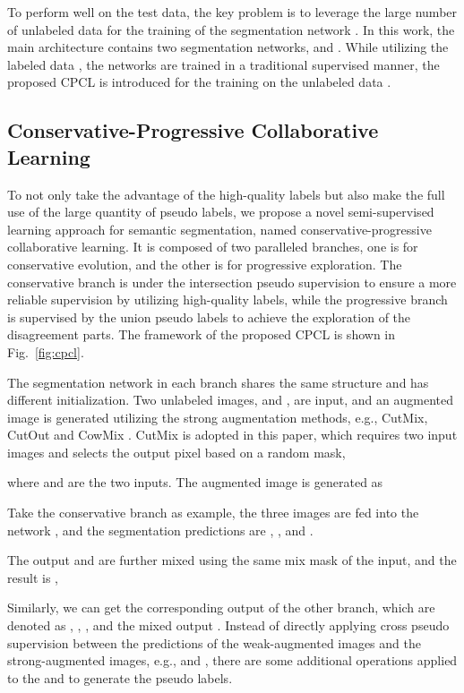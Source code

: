 \documentclass[journal]{IEEEtran}
\begin{document}
To perform well on the test data, the key problem is to leverage the large number of unlabeled data  for the training of the segmentation network . In this 
work, the main architecture contains two segmentation networks,  and . While utilizing the labeled data , the networks are trained in a traditional supervised manner, the proposed CPCL is introduced for the training on the 
unlabeled data . 

\subsection{Conservative-Progressive Collaborative Learning}

To not only take the advantage of the high-quality labels but also make the full use of the large quantity of pseudo labels, we propose a novel semi-supervised learning 
approach for semantic segmentation, named conservative-progressive collaborative learning. It is composed of two paralleled branches, one is for conservative evolution, 
and the other is for progressive exploration. The conservative branch is under the intersection pseudo supervision to ensure a more reliable supervision by utilizing 
high-quality labels, while the progressive branch is supervised by the union pseudo labels to achieve the exploration of the disagreement parts. The framework of the 
proposed CPCL is shown in Fig.~\ref{fig:cpcl}.

The segmentation network in each branch shares the same structure and has different initialization. Two unlabeled images,  and , are input, and an augmented 
image  is generated utilizing the strong augmentation methods, e.g., CutMix, CutOut and CowMix \cite{2019Semi}. CutMix is adopted in this paper, which requires two 
input images and selects the output pixel based on a random mask,

where  and  are the two inputs. The augmented image  is generated as


Take the conservative branch as example, the three images are fed into the 
network , and the segmentation predictions are , , and .







The output  and  are further mixed using the same mix mask of the input, and the result is ,


Similarly, we can get the corresponding output of the other 
branch, which are denoted as , , , and the mixed output . Instead of directly applying cross pseudo supervision between the predictions 
of the weak-augmented images and the strong-augmented images, e.g.,  and , there are some additional operations applied 
to the  and  to generate the pseudo labels.
\end{document}
